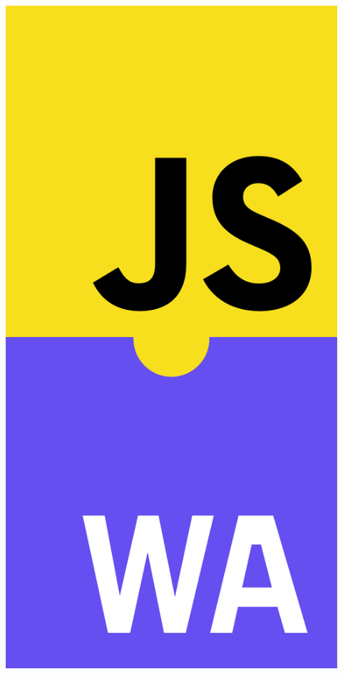 \documentclass[english,template=rapport]{his}
\begin{document}
\clearpage
\pagestyle{empty}
\centering
\includegraphics[width=12.3cm,keepaspectratio]{figures/javascript+webassembly}
\end{document}
